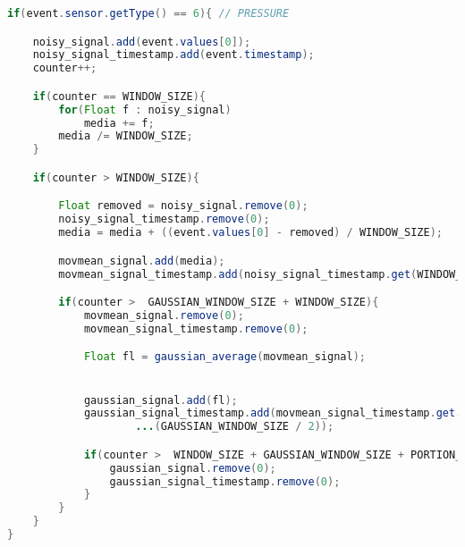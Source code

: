 \begin{lstlisting}[language=Java,  basicstyle=\footnotesize]
  if(event.sensor.getType() == 6){ // PRESSURE

    noisy_signal.add(event.values[0]);
    noisy_signal_timestamp.add(event.timestamp);
    counter++;

    if(counter == WINDOW_SIZE){
        for(Float f : noisy_signal)
            media += f;
        media /= WINDOW_SIZE;
    }

    if(counter > WINDOW_SIZE){

        Float removed = noisy_signal.remove(0);
        noisy_signal_timestamp.remove(0);
        media = media + ((event.values[0] - removed) / WINDOW_SIZE);

        movmean_signal.add(media);
        movmean_signal_timestamp.add(noisy_signal_timestamp.get(WINDOW_SIZE/2));

        if(counter >  GAUSSIAN_WINDOW_SIZE + WINDOW_SIZE){
            movmean_signal.remove(0);
            movmean_signal_timestamp.remove(0);

            Float fl = gaussian_average(movmean_signal);


            gaussian_signal.add(fl);
            gaussian_signal_timestamp.add(movmean_signal_timestamp.get...
					...(GAUSSIAN_WINDOW_SIZE / 2));

            if(counter >  WINDOW_SIZE + GAUSSIAN_WINDOW_SIZE + PORTION_OF_SIGNAL){
                gaussian_signal.remove(0);
                gaussian_signal_timestamp.remove(0);
            }
        }
    }
}
\end{lstlisting}